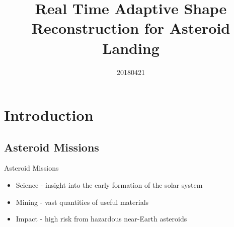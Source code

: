 \documentclass[11pt,professionalfonts,aspectratio=169]{beamer}
\title[Asteroid Reconstruction]{\large\textbf Real Time Adaptive Shape Reconstruction for Asteroid Landing}
\author{\vspace*{-0.3cm}}
\institute{
	\footnotesize
	{\normalsize\bf{Shankar Kulumani}}\\
	\vspace*{0.2cm}
  	\textbf{Department of Mechanical \& Aerospace Engineering}\\ \vspace*{0.5cm}
 	\begin{figure} %
       	\texttt{[image: gw\_txh\_2cs\_pos]}
  	\end{figure}
}
\date{20180421}
\begin{document}

\setcounter{framenumber}{-1}
\begin{frame} %
  \titlepage
\end{frame}   %

\section[Introduction]{Introduction}
\subsection[Motivation]{Asteroid Missions}  
\begin{frame}{Asteroid Missions}
\begin{itemize}
    \item<1-> Science - insight into the early formation of the solar system
    \item<2-> Mining - vast quantities of useful materials
    \item<3-> Impact - high risk from hazardous near-Earth asteroids
\end{itemize}    

\end{frame}
\end{document}
